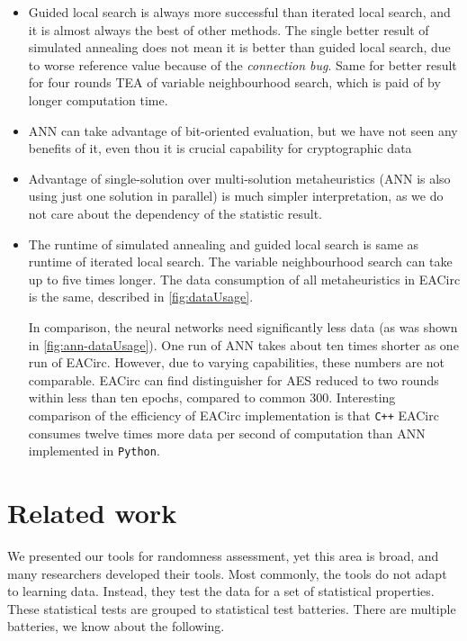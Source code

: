 \documentclass[
  print, %
  Table,   %
  nolof,     %
  nolot,     %
  11pt, %
  oneside  %
]{fithesis3}
\begin{document}
\begin{itemize}
    \item Guided local search is always more successful than iterated local search, and it is almost always the best of other methods. The single better result of simulated annealing does not mean it is better than guided local search, due to worse reference value because of the \textit{connection bug}. Same for better result for four rounds TEA of variable neighbourhood search, which is paid of by longer computation time.
    \item ANN can take advantage of bit-oriented evaluation, but we have not seen any benefits of it, even thou it is crucial capability for cryptographic data
    \item Advantage of single-solution over multi-solution metaheuristics (ANN is also using just one solution in parallel) is much simpler interpretation, as we do not care about the dependency of the statistic result.
    \item The runtime of simulated annealing and guided local search is same as runtime of iterated local search. The variable neighbourhood search can take up to five times longer. The data consumption of all metaheuristics in EACirc is the same, described in \cref{fig:dataUsage}.
    
    In comparison, the neural networks need significantly less data (as was shown in \cref{fig:ann-dataUsage}). One run of ANN takes about ten times shorter as one run of EACirc. However, due to varying capabilities, these numbers are not comparable. EACirc can find distinguisher for AES reduced to two rounds within less than ten epochs, compared to common 300. Interesting comparison of the efficiency of EACirc implementation is that \texttt{C++} EACirc consumes twelve times more data per second of computation than ANN implemented in \texttt{Python}.
\end{itemize}

\chapter{Related work}
\label{chap:relatwork}

We presented our tools for randomness assessment, yet this area is broad, and many researchers developed their tools. Most commonly, the tools do not adapt to learning data. Instead, they test the data for a set of statistical properties. These statistical tests are grouped to statistical test batteries. There are multiple batteries, we know about the following.
\end{document}
